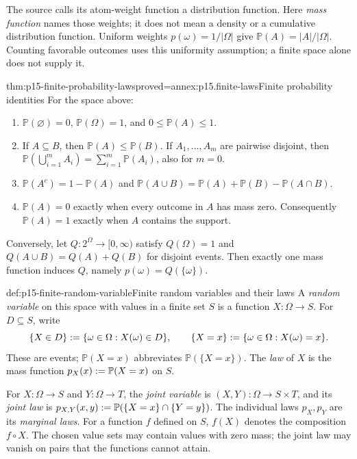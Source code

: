 The source calls its atom-weight function a distribution function. Here
\emph{mass function} names those weights; it does not mean a density or a
cumulative distribution function. Uniform weights \(p(\omega)=1/|\Omega|\)
give \(\mathbb P(A)=|A|/|\Omega|\). Counting favorable outcomes uses this
uniformity assumption; a finite space alone does not supply it.

\begin{hbtheorem}{thm:p15-finite-probability-laws}{proved=annex:p15.finite-laws}{Finite probability identities}
For the space above:
\begin{enumerate}
\item \(\mathbb P(\varnothing)=0\), \(\mathbb P(\Omega)=1\), and
      \(0\leq\mathbb P(A)\leq1\).
\item If \(A\subseteq B\), then \(\mathbb P(A)\leq\mathbb P(B)\).
      If \(A_1,\ldots,A_m\) are pairwise disjoint, then
      \(\mathbb P(\bigcup_{i=1}^m A_i)=\sum_{i=1}^m\mathbb P(A_i)\),
      also for \(m=0\).
\item \(\mathbb P(A^c)=1-\mathbb P(A)\) and
      \(\mathbb P(A\cup B)=\mathbb P(A)+\mathbb P(B)-\mathbb P(A\cap B)\).
\item \(\mathbb P(A)=0\) exactly when every outcome in \(A\) has
      mass zero. Consequently \(\mathbb P(A)=1\) exactly when \(A\)
      contains the support.
\end{enumerate}
Conversely, let \(Q:2^\Omega\to[0,\infty)\) satisfy \(Q(\Omega)=1\)
and \(Q(A\cup B)=Q(A)+Q(B)\) for disjoint events. Then exactly one
mass function induces \(Q\), namely \(p(\omega)=Q(\{\omega\})\).
\end{hbtheorem}

\begin{hbdefinition}{def:p15-finite-random-variable}{Finite random variables and their laws}
A \emph{random variable} on this space with values in a finite set \(S\)
is a function \(X:\Omega\to S\). For \(D\subseteq S\), write
\[
 \{X\in D\}\mathrel{:=}\{\omega\in\Omega:X(\omega)\in D\},\qquad
 \{X=x\}\mathrel{:=}\{\omega\in\Omega:X(\omega)=x\}.
\]
These are events; \(\mathbb P(X=x)\) abbreviates
\(\mathbb P(\{X=x\})\). The \emph{law} of \(X\) is the mass
function \(p_X(x)\mathrel{:=}\mathbb P(X=x)\) on \(S\).

For \(X:\Omega\to S\) and \(Y:\Omega\to T\), the \emph{joint
variable} is \((X,Y):\Omega\to S\times T\), and its \emph{joint law}
is \(p_{X,Y}(x,y)\mathrel{:=}\mathbb P(\{X=x\}\cap\{Y=y\})\).
The individual laws \(p_X,p_Y\) are its \emph{marginal laws}.
For a function \(f\) defined on \(S\), \(f(X)\) denotes the
composition \(f\circ X\).
The chosen value sets may contain values with zero mass; the joint law may
vanish on pairs that the functions cannot attain.
\end{hbdefinition}

